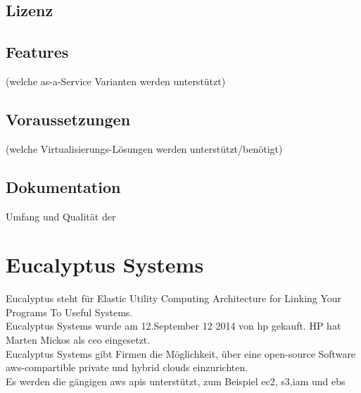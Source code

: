 \documentclass[a4paper,nochapterprefix,ngerman,12pt]{scrreprt}
\begin{document}
\section{Lizenz}
\section{Features}
(welche as-a-Service Varianten werden unterstützt)
\section{Voraussetzungen}
(welche Virtualisierungs-Lösungen werden unterstützt/benötigt)
\section{Dokumentation}
Umfang und Qualität der

\chapter{Eucalyptus Systems} \thispagestyle{fancy}
Eucalyptus steht für Elastic Utility Computing Architecture for Linking Your Programs To Useful Systems. \cite{EucalyptusSlideShare}\\
Eucalyptus Systems wurde am 12.September 12 2014 von \gls{hp} gekauft. \cite{eucHP2}
HP hat Marten Mickos als \gls{ceo} eingesetzt. \cite{eucHP1}
\\
Eucalyptus Systems gibt Firmen die Möglichkeit, über eine open-source Software \gls{aws}-compartible private und hybrid clouds einzurichten. \\
Es werden die gängigen \gls{aws} \gls{api}s unterstützt, zum Beispiel \gls{ec2}, \gls{s3},\gls{iam} und \gls{ebs}
\cite{eucHP2}
\end{document}
